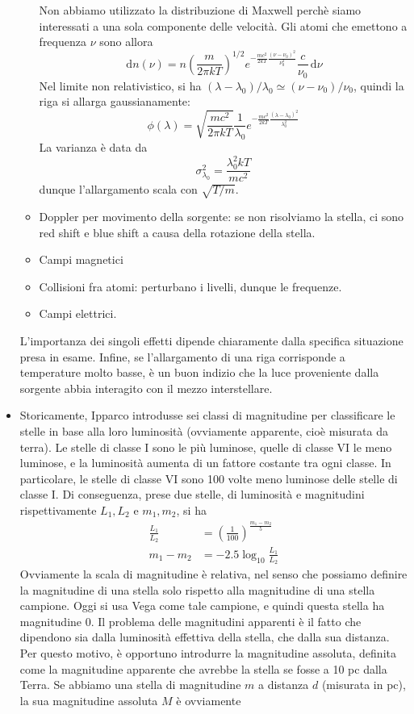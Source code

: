 \documentclass[a4paper,11pt]{article}
\renewcommand{\d}{\mathrm{d}} %
\renewcommand{\d}{\,\mathrm{d}}
\theoremstyle{theorem}
\theoremstyle{definition}
\begin{document}
\begin{itemize}
\begin{itemize}
		Non abbiamo utilizzato la distribuzione di Maxwell perchè siamo interessati a una sola componente delle velocità. Gli atomi che emettono a frequenza $\nu$ sono allora
		\[\d n(\nu)=n\left(\frac{m}{2\pi kT}\right)^{1/2}e^{-\frac{mc^2}{2kT}\frac{(\nu-\nu_0)^2}{\nu_0^2}}\frac{c}{\nu_0}\d\nu\]
		Nel limite non relativistico, si ha $(\lambda-\lambda_0)/\lambda_0\simeq(\nu-\nu_0)/\nu_0$, quindi la riga si allarga gaussianamente:
		\[\phi(\lambda)=\sqrt{\frac{mc^2}{2\pi kT}}\frac{1}{\lambda_0}e^{-\frac{mc^2}{2kT}\frac{(\lambda-\lambda_0)^2}{\lambda_0^2}}\]
		La varianza è data da
		\[\sigma_{\lambda_0}^2=\frac{\lambda_0^2kT}{mc^2}\]
		dunque l'allargamento scala con $\sqrt{T/m}$.
		\item Doppler per movimento della sorgente: se non risolviamo la stella, ci sono red shift e blue shift a causa della rotazione della stella.
		\item Campi magnetici
		\item Collisioni fra atomi: perturbano i livelli, dunque le frequenze.
		\item Campi elettrici.
	\end{itemize}
	L'importanza dei singoli effetti dipende chiaramente dalla specifica situazione presa in esame. Infine, se l'allargamento di una riga corrisponde a temperature molto basse, è un buon indizio che la luce proveniente dalla sorgente abbia interagito con il mezzo interstellare.
	\item Storicamente, Ipparco introdusse sei classi di magnitudine per classificare le stelle in base alla loro luminosità (ovviamente apparente, cioè misurata da terra). Le stelle di classe I sono le più luminose, quelle di classe VI le meno luminose, e la luminosità aumenta di un fattore costante tra ogni classe. In particolare, le stelle di classe VI sono 100 volte meno luminose delle stelle di classe I. Di conseguenza, prese due stelle, di luminosità e magnitudini rispettivamente $L_1,L_2$ e $m_1,m_2$, si ha
	\begin{align*}\frac{L_1}{L_2}&=\left(\frac{1}{100}\right)^{\frac{m_1-m_2}{5}}\\m_1-m_2&=-2.5\log_{10}\frac{L_1}{L_2}\end{align*}
	Ovviamente la scala di magnitudine è relativa, nel senso che possiamo definire la magnitudine di una stella solo rispetto alla magnitudine di una stella campione. Oggi si usa Vega come tale campione, e quindi questa stella ha magnitudine 0. Il problema delle magnitudini apparenti è il fatto che dipendono sia dalla luminosità effettiva della stella, che dalla sua distanza. Per questo motivo, è opportuno introdurre la magnitudine assoluta, definita come la magnitudine apparente che avrebbe la stella se fosse a 10 pc dalla Terra. Se abbiamo una stella di magnitudine $m$ a distanza $d$ (misurata in pc), la sua magnitudine assoluta $M$ è ovviamente

\end{itemize}
\end{document}
